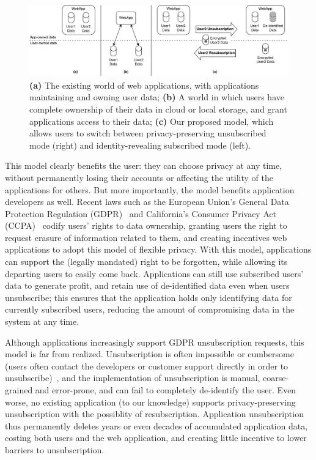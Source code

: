 \begin{figure}[ht!]
    \centering
    \includegraphics[width=\textwidth]{img/worlds}

    \caption{\textbf{(a)} The existing world of web applications, with applications maintaining and
    owning user data; \textbf{(b)} A world in which users have complete ownership of their data in cloud or local
    storage, and grant applications access to their data;
    \textbf{(c)} Our proposed model, which allows users to switch between privacy-preserving unsubscribed
    mode (right) and identity-revealing subscribed mode (left).}
    \label{fig:world}
\end{figure}

This model clearly benefits the user: they can choose privacy at any time, without permanently
losing their accounts or affecting the utility of the applications for others.  But more
importantly, the model benefits application developers as well. Recent laws such as the European
Union's General Data Protection Regulation (GDPR)~\cite{eu:gdpr} and California's Consumer Privacy
Act (CCPA)~\cite{ca:privacy-act} codify users' rights to data ownership, granting users the right to
request erasure of information related to them, and creating incentives web applications to adopt
this model of flexible privacy. With this model, applications can support the (legally mandated)
right to be forgotten, while allowing its departing users to easily come back. Applications can
still use subscribed users' data to generate profit, and retain use of de-identified data even when
users unsubscribe; this ensures that the application holds only identifying data for currently subscribed users,
reducing the amount of compromising data in the system at any time.

Although applications increasingly support GDPR unsubscription requests, this model is far from
realized. Unsubscription is often impossible or cumbersome (users often contact the developers or
customer support directly in order to unsubscribe)~\cite{jdm}, and the implementation of
unsubscription is manual, coarse-grained and error-prone, and can fail to completely de-identify the
user.  Even worse, no existing application (to our knowledge) supports privacy-preserving
unsubscription with the possiblity of resubscription.  Application unsubscription thus permanently
deletes years or even decades of accumulated application data, costing both users and the web
application, and creating little incentive to lower barriers to unsubscription. 

